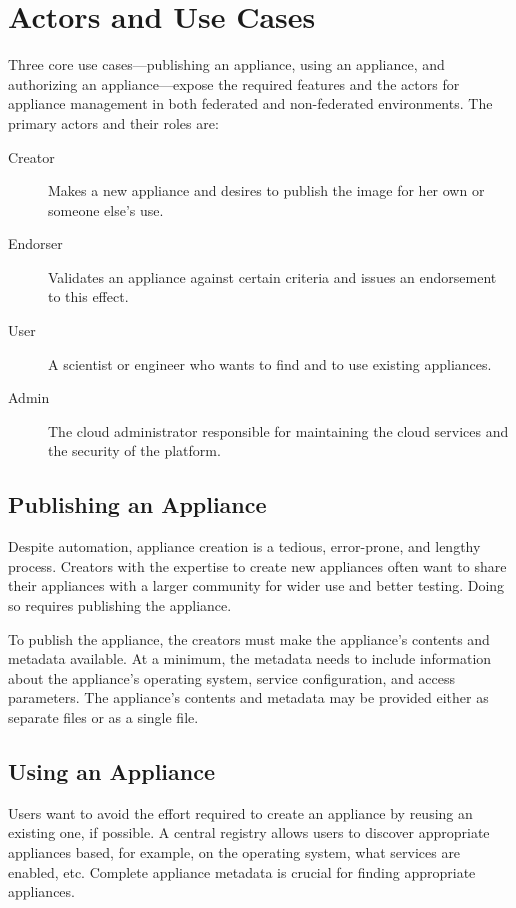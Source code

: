 \section{Actors and Use Cases}
\label{sec:use-cases}

Three core use cases---publishing an appliance, using an appliance,
and authorizing an appliance---expose the required features and the
actors for appliance management in both federated and non-federated
environments.  The primary actors and their roles are:
\begin{description}
\item[Creator] Makes a new appliance and desires to publish the image
  for her own or someone else's use.
\item[Endorser] Validates an appliance against certain criteria and
  issues an endorsement to this effect.
\item[User] A scientist or engineer who wants to find and to use
  existing appliances.
\item[Admin] The cloud administrator responsible for
  maintaining the cloud services and the security of the platform.
\end{description}

\subsection{Publishing an Appliance}

Despite automation, appliance creation is a tedious, error-prone, and
lengthy process.  Creators with the expertise to create new
appliances often want to share their appliances with a larger
community for wider use and better testing.  Doing so requires
publishing the appliance.

To publish the appliance, the creators must make the appliance's
contents and metadata available.  At a minimum, the metadata needs to
include information about the appliance's operating system, service
configuration, and access parameters.  The appliance's contents and
metadata may be provided either as separate files or as a single file.

\subsection{Using an Appliance}

Users want to avoid the effort required to create an appliance by
reusing an existing one, if possible.  A central registry allows users
to discover appropriate appliances based, for example, on the
operating system, what services are enabled, etc.  Complete appliance
metadata is crucial for finding appropriate appliances.

